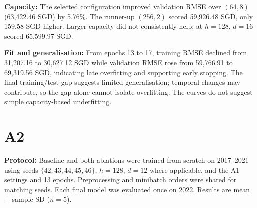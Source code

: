 \documentclass[10pt,a4paper]{article}
\begin{document}
\textbf{Capacity:} The selected configuration improved validation RMSE over $(64,8)$ (63,422.46 SGD) by 5.76\%. The runner-up $(256,2)$ scored 59,926.48 SGD, only 159.58 SGD higher. Larger capacity did not consistently help: at $h=128$, $d=16$ scored 65,599.97 SGD.

\textbf{Fit and generalisation:} From epochs 13 to 17, training RMSE declined from 31,207.16 to 30,627.12 SGD while validation RMSE rose from 59,766.91 to 69,319.56 SGD, indicating late overfitting and supporting early stopping. The final training/test gap suggests limited generalisation; temporal changes may contribute, so the gap alone cannot isolate overfitting. The curves do not suggest simple capacity-based underfitting.
\section*{A2}

\textbf{Protocol:} Baseline and both ablations were trained from scratch on 2017--2021 using seeds $\{42,43,44,45,46\}$, $h=128$, $d=12$ where applicable, and the A1 settings and 13 epochs. Preprocessing and minibatch orders were shared for matching seeds. Each final model was evaluated once on 2022. Results are mean $\pm$ sample SD ($n=5$).
\end{document}
